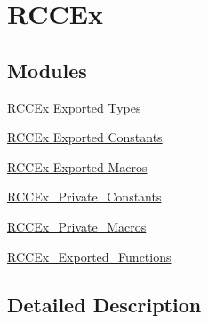 \hypertarget{group___r_c_c_ex}{\section{R\-C\-C\-Ex}
\label{group___r_c_c_ex}
}
\subsection*{Modules}
\begin{DoxyCompactItemize}
\item 
\hyperlink{group___r_c_c_ex___exported___types}{R\-C\-C\-Ex Exported Types}
\item 
\hyperlink{group___r_c_c_ex___exported___constants}{R\-C\-C\-Ex Exported Constants}
\item 
\hyperlink{group___r_c_c_ex___exported___macros}{R\-C\-C\-Ex Exported Macros}
\item 
\hyperlink{group___r_c_c_ex___private___constants}{R\-C\-C\-Ex\-\_\-\-Private\-\_\-\-Constants}
\item 
\hyperlink{group___r_c_c_ex___private___macros}{R\-C\-C\-Ex\-\_\-\-Private\-\_\-\-Macros}
\item 
\hyperlink{group___r_c_c_ex___exported___functions}{R\-C\-C\-Ex\-\_\-\-Exported\-\_\-\-Functions}
\end{DoxyCompactItemize}


\subsection{Detailed Description}
